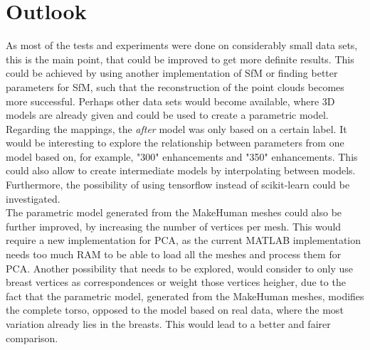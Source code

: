 \section{Outlook}
As most of the tests and experiments were done on considerably small data sets, this is the main point, that could be improved to get more definite results. This could be achieved by using another implementation of SfM or finding better parameters for SfM, such that the reconstruction of the point clouds becomes more successful. Perhaps other data sets would become available, where 3D models are already given and could be used to create a parametric model. \\
Regarding the mappings, the \textit{after} model was only based on a certain label. It would be interesting to explore the relationship between parameters from one model based on, for example, "300" enhancements and "350" enhancements. This could also allow to create intermediate models by interpolating between models. Furthermore, the possibility of using tensorflow instead of scikit-learn could be investigated.\\
The parametric model generated from the MakeHuman meshes could also be further improved, by increasing the number of vertices per mesh. This would require a new implementation for PCA, as the current MATLAB implementation needs too much RAM to be able to load all the meshes and process them for PCA. Another possibility that needs to be explored, would consider to only use breast vertices as correspondences or weight those vertices heigher, due to the fact that the parametric model, generated from the MakeHuman meshes, modifies the complete torso, opposed to the model based on real data, where the most variation already lies in the breasts. This would lead to a better and fairer comparison.
